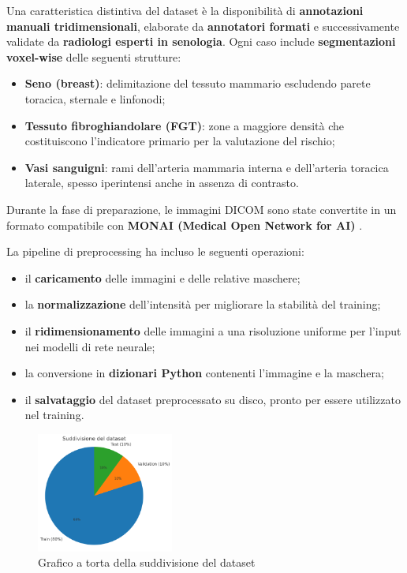 Una caratteristica distintiva del dataset è la disponibilità di \textbf{annotazioni manuali tridimensionali}, elaborate da \textbf{annotatori formati} e successivamente validate da \textbf{radiologi esperti in senologia}. Ogni caso include \textbf{segmentazioni voxel-wise} delle seguenti strutture:
\begin{itemize}
\item \textbf{Seno (breast)}: delimitazione del tessuto mammario escludendo parete toracica, sternale e linfonodi;
\item \textbf{Tessuto fibroghiandolare (FGT)}: zone a maggiore densità che costituiscono l’indicatore primario per la valutazione del rischio;
\item \textbf{Vasi sanguigni}: rami dell’arteria mammaria interna e dell’arteria toracica laterale, spesso iperintensi anche in assenza di contrasto.
\end{itemize}


Durante la fase di preparazione, le immagini DICOM sono state convertite in un formato compatibile con \textbf{MONAI (Medical Open Network for AI)} \cite{cardoso2022monai}.



La pipeline di preprocessing ha incluso le seguenti operazioni:
\begin{itemize}
\item il \textbf{caricamento} delle immagini e delle relative maschere;
\item la \textbf{normalizzazione} dell’intensità per migliorare la stabilità del training;
\item il \textbf{ridimensionamento} delle immagini a una risoluzione uniforme per l’input nei modelli di rete neurale;
\item la conversione in \textbf{dizionari Python} contenenti l'immagine e la maschera;
\item il \textbf{salvataggio} del dataset preprocessato su disco, pronto per essere utilizzato nel training.
\end{itemize}



\begin{figure} 
  	\centering 
 	\includegraphics[width=0.4\textwidth]{figures/split_pie_chart.png} 
    \caption{Grafico a torta della suddivisione del dataset}
 \end{figure} 

